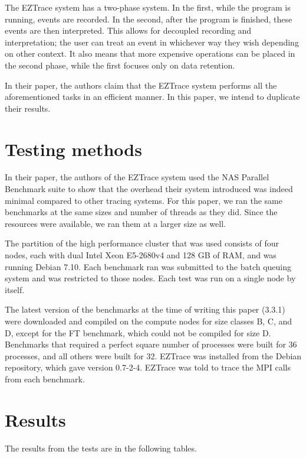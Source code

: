 \documentclass[12pt]{article}
\begin{document}
The EZTrace system has a two-phase system. In the first, while the program is running, events are recorded. In the second, 
after the program is finished, these events are then interpreted. This allows for decoupled recording and interpretation; 
the user can treat an event in whichever way they wish depending on other context. It also means that more expensive 
operations can be placed in the second phase, while the first focuses only on data retention. \cite{Trahay2011}

In their paper, the authors claim that the EZTrace system performs all the aforementioned tasks in an efficient manner. 
In this paper, we intend to duplicate their results.

\section{Testing methods}

In their paper, the authors of the EZTrace system used the NAS Parallel Benchmark suite \cite{Bailey1991} to show that the 
overhead their system introduced was indeed minimal compared to other tracing systems. For this paper, we ran the same 
benchmarks at the same sizes and number of threads as they did. Since the resources were available, we ran them at a 
larger size as well. \cite{Trahay2011}

The partition of the high performance cluster that was used consists of four nodes, each with dual Intel Xeon E5-2680v4 
and 128 GB of RAM, and was running Debian 7.10. Each benchmark ran was submitted to the batch queuing system and was 
restricted to those nodes. Each test was run on a single node by itself.

The latest version of the benchmarks at the time of writing this paper (3.3.1) were downloaded and compiled on the compute 
nodes for size classes B, C, and D, except for the FT benchmark, which could not be compiled for size D. Benchmarks that 
required a perfect square number of processes were built for 36 processes, and all others were built for 32. EZTrace was 
installed from the Debian repository, which gave version 0.7-2-4. EZTrace was told to trace the MPI calls from each benchmark.

\section{Results}

The results from the tests are in the following tables.
\end{document}
